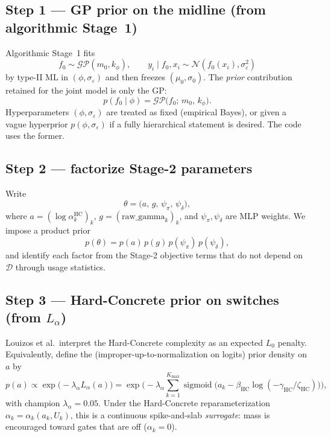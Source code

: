 \documentclass[11pt,a4paper]{article}
\theoremstyle{plain}
\theoremstyle{definition}
\theoremstyle{remark}
\newcommand{\Ncal}{\mathcal{N}}
\newcommand{\GP}{\mathcal{GP}}
\newcommand{\D}{\mathcal{D}}
\newcommand{\tht}{\theta}
\newcommand{\sigmoid}{\operatorname{sigmoid}}
\newcommand{\Kmax}{K_{\max}}
\begin{document}
\subsection{Step 1 --- GP prior on the midline (from algorithmic Stage~1)}
Algorithmic Stage~1 fits
\[
  f_0\sim\GP(m_0,k_\phi),
  \qquad
  y_i\mid f_0,x_i\sim\Ncal(f_0(x_i),\sigma_\varepsilon^2)
\]
by type-II ML in \((\phi,\sigma_\varepsilon)\) and then freezes
\((\mu_0,\sigma_0)\).
The \emph{prior} contribution retained for the joint model is only the GP:
\begin{equation}
  p(f_0\mid\phi)
  =
  \GP\bigl(f_0;\,m_0,\,k_\phi\bigr).
  \label{eq:prior-f0}
\end{equation}
Hyperparameters \((\phi,\sigma_\varepsilon)\) are treated as fixed (empirical Bayes), or
given a vague hyperprior \(p(\phi,\sigma_\varepsilon)\) if a fully hierarchical
statement is desired. The code uses the former.

\subsection{Step 2 --- factorize Stage-2 parameters}
Write
\[
  \tht
  =
  \bigl(
    a,\,
    g,\,
    \psi_\pi,\,
    \psi_\delta
  \bigr),
\]
where \(a=(\log\alpha_k^{\mathrm{HC}})_k\), \(g=(\mathrm{raw\_gamma}_k)_k\),
and \(\psi_\pi,\psi_\delta\) are MLP weights.
We impose a product prior
\begin{equation}
  p(\tht)
  =
  p(a)\,p(g)\,p(\psi_\pi)\,p(\psi_\delta),
  \label{eq:prior-theta-prod}
\end{equation}
and identify each factor from the Stage-2 objective terms that do not depend on \(\D\)
through usage statistics.

\subsection{Step 3 --- Hard-Concrete prior on switches (from \(L_\alpha\))}
Louizos et al.\ interpret the Hard-Concrete complexity as an expected \(L_0\) penalty.
Equivalently, define the (improper-up-to-normalization on logits) prior density on \(a\) by
\begin{equation}
  p(a)
  \propto
  \exp\!\bigl(-\lambda_\alpha L_\alpha(a)\bigr)
  =
  \exp\!\Biggl(
    -\lambda_\alpha
    \sum_{k=1}^{\Kmax}
    \sigmoid\!\bigl(
      a_k-\beta_{\mathrm{HC}}\log(-\gamma_{\mathrm{HC}}/\zeta_{\mathrm{HC}})
    \bigr)
  \Biggr),
  \label{eq:prior-a}
\end{equation}
with champion \(\lambda_\alpha=0.05\).
Under the Hard-Concrete reparameterization \(\alpha_k=\alpha_k(a_k,U_k)\), this is a
continuous spike-and-slab \emph{surrogate}: mass is encouraged toward gates that are
off (\(\alpha_k=0\)).
\end{document}
